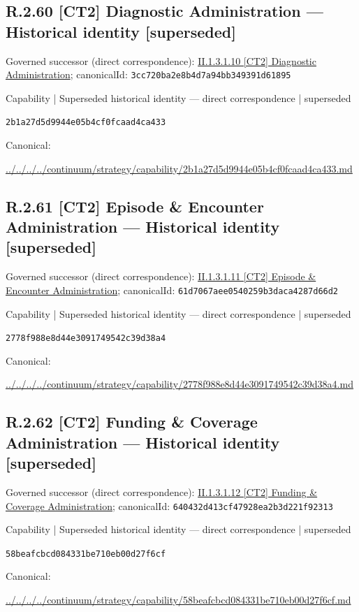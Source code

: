 \documentclass[10pt,a4paper]{article}
\begin{document}
\subsection*{R.2.60 [CT2] Diagnostic Administration — Historical identity [superseded]}
Governed successor (direct correspondence): \hyperref[element-3cc720ba2e8b4d7a94bb349391d61895]{II.1.3.1.10 [CT2] Diagnostic Administration}; canonicalId: \texttt{3cc720ba2e8b4d7a94bb349391d61895}\par
\label{element-2b1a27d5d9944e05b4cf0fcaad4ca433}
{\small Capability | Superseded historical identity — direct correspondence | superseded}\par
\texttt{2b1a27d5d9944e05b4cf0fcaad4ca433}\par
Canonical: \par
{\footnotesize\url{../../../../continuum/strategy/capability/2b1a27d5d9944e05b4cf0fcaad4ca433.md}}\par
\subsection*{R.2.61 [CT2] Episode \& Encounter Administration — Historical identity [superseded]}
Governed successor (direct correspondence): \hyperref[element-61d7067aee0540259b3daca4287d66d2]{II.1.3.1.11 [CT2] Episode \& Encounter Administration}; canonicalId: \texttt{61d7067aee0540259b3daca4287d66d2}\par
\label{element-2778f988e8d44e3091749542c39d38a4}
{\small Capability | Superseded historical identity — direct correspondence | superseded}\par
\texttt{2778f988e8d44e3091749542c39d38a4}\par
Canonical: \par
{\footnotesize\url{../../../../continuum/strategy/capability/2778f988e8d44e3091749542c39d38a4.md}}\par
\subsection*{R.2.62 [CT2] Funding \& Coverage Administration — Historical identity [superseded]}
Governed successor (direct correspondence): \hyperref[element-640432d413cf47928ea2b3d221f92313]{II.1.3.1.12 [CT2] Funding \& Coverage Administration}; canonicalId: \texttt{640432d413cf47928ea2b3d221f92313}\par
\label{element-58beafcbcd084331be710eb00d27f6cf}
{\small Capability | Superseded historical identity — direct correspondence | superseded}\par
\texttt{58beafcbcd084331be710eb00d27f6cf}\par
Canonical: \par
{\footnotesize\url{../../../../continuum/strategy/capability/58beafcbcd084331be710eb00d27f6cf.md}}\par
\end{document}
